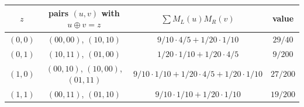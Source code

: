\begin{tabular}{cccc}\toprule
$z$ & pairs $(u,v)$ with $u\oplus v=z$ & $\sum M_L(u)M_R(v)$ & value \\\midrule
$(0,0)$ & $(00,00)$, $(10,10)$ & $9/10\cdot4/5 + 1/20\cdot1/10$ & $29/40$ \\
$(0,1)$ & $(10,11)$, $(01,00)$ & $1/20\cdot1/10 + 1/20\cdot4/5$ & $9/200$ \\
$(1,0)$ & $(00,10)$, $(10,00)$, $(01,11)$ & $9/10\cdot1/10 + 1/20\cdot4/5 + 1/20\cdot1/10$ & $27/200$ \\
$(1,1)$ & $(00,11)$, $(01,10)$ & $9/10\cdot1/10 + 1/20\cdot1/10$ & $19/200$ \\
\bottomrule\end{tabular}
